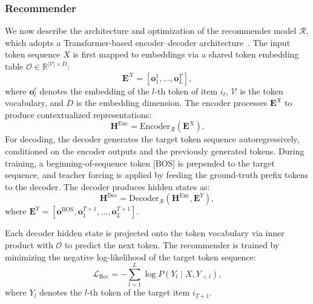 \subsubsection{Recommender}
We now describe the architecture and optimization of the recommender model $\mathcal{R}$, which adopts a Transformer-based encoder--decoder architecture~\cite{T5}. The input token sequence $X$ is first mapped to embeddings via a shared token embedding table $\bm{\mathcal{O}} \in \mathbb{R}^{|\mathcal{V}|\times D}$:
\begin{equation}\label{eq:rec_input}
\bm{E}^X = [\bm{o}_1^1, \ldots, \bm{o}_L^T],
\end{equation}
where $\bm{o}_l^t$ denotes the embedding of the $l$-th token of item $i_t$, $\mathcal{V}$ is the token vocabulary, and $D$ is the embedding dimension. The encoder processes $\bm{E}^X$ to produce contextualized representations:
\begin{equation}\label{eq:rec_encoder}
\bm{H}^{\text{Enc}} = \text{Encoder}_{\mathcal{R}}(\bm{E}^X).
\end{equation}
For decoding, the decoder generates the target token sequence autoregressively, conditioned on the encoder outputs and the previously generated tokens. During training, a beginning-of-sequence token [BOS] is prepended to the target sequence, and teacher forcing is applied by feeding the ground-truth prefix tokens to the decoder. The decoder produces hidden states as:
\begin{equation}\label{eq:rec_decoder}
\bm{H}^{\text{Dec}} = \text{Decoder}_{\mathcal{R}}(\bm{H}^{\text{Enc}}, \bm{E}^Y),
\end{equation}
where $\bm{E}^Y = [\bm{o}^{\text{BOS}}, \bm{o}_1^{T+1}, \ldots, \bm{o}_L^{T+1}]$.

Each decoder hidden state is projected onto the token vocabulary via inner product with $\bm{\mathcal{O}}$ to predict the next token. The recommender is trained by minimizing the negative log-likelihood of the target token sequence:
\begin{equation}\label{eq:loss_rec}
\mathcal{L}_{\text{Rec}} = -\sum_{l=1}^{L} \log P(Y_l \mid X, Y_{<l}),
\end{equation}
where $Y_l$ denotes the $l$-th token of the target item $i_{T+1}$.
